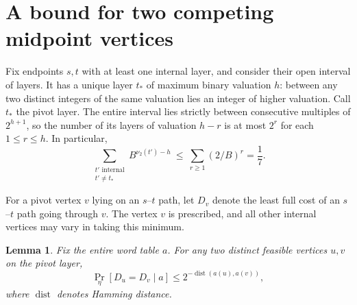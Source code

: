 \documentclass[11pt]{article}
\newtheorem{lemma}[theorem]{Lemma}
\newcommand{\dist}{\operatorname{dist}}
\begin{document}
\section{A bound for two competing midpoint vertices}

Fix endpoints $s,t$ with at least one internal layer, and consider their
open interval of layers. It has a unique layer $t_*$ of maximum binary
valuation $h$: between any two distinct integers of the same valuation
lies an integer of higher valuation. Call $t_*$ the pivot layer.
The entire interval lies strictly between consecutive multiples of
$2^{h+1}$, so the number of its layers of valuation $h-r$ is at most
$2^r$ for each $1\le r\le h$. In particular,
\begin{equation}\label{eq:geometry}
 \sum_{\substack{t'\text{ internal}\\t'\ne t_*}} B^{\nu_2(t')-h}
                 \ \le\ \sum_{r\ge1}(2/B)^r=\frac17 .
\end{equation}

For a pivot vertex $v$ lying on an $s$--$t$ path, let $D_v$ denote the
least full cost of an $s$--$t$ path going through $v$. The vertex $v$ is
prescribed, and all other internal vertices may vary in taking this minimum.

\begin{lemma}\label{lem:mask}
Fix the entire word table $a$. For any two distinct feasible vertices
$u,v$ on the pivot layer,
\[
           \Pr_\eta[D_u=D_v\mid a]\le
                    2^{-\dist(a(u),a(v))},
\]
where $\dist$ denotes Hamming distance.
\end{lemma}
\end{document}
